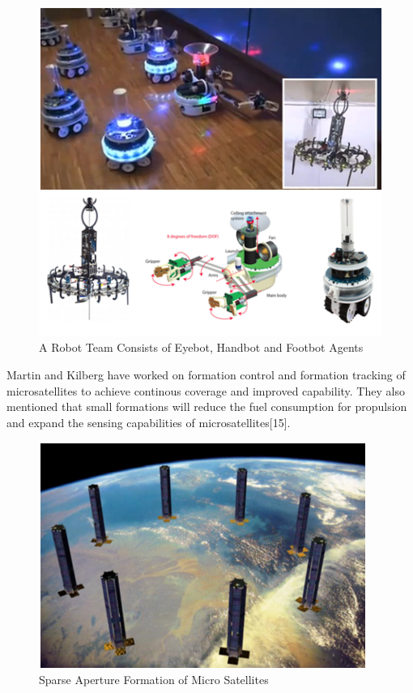 \documentclass[twoside]{article}
\begin{document}
	\begin{figure}[H]
		\caption{A Robot Team Consists of Eyebot, Handbot and Footbot Agents}
		\centering
		\includegraphics[scale = 1]{eyebot}
	\end{figure} 


Martin and Kilberg have worked on formation control and formation tracking of  microsatellites to achieve continous coverage and improved capability. They also mentioned that small formations will reduce the fuel consumption for propulsion and expand the sensing capabilities of microsatellites[15].

	\begin{figure}[H]
		\caption{Sparse Aperture Formation of Micro Satellites}
		\centering
		\includegraphics[scale = 1]{Satellite}
	\end{figure} 
\end{document}
